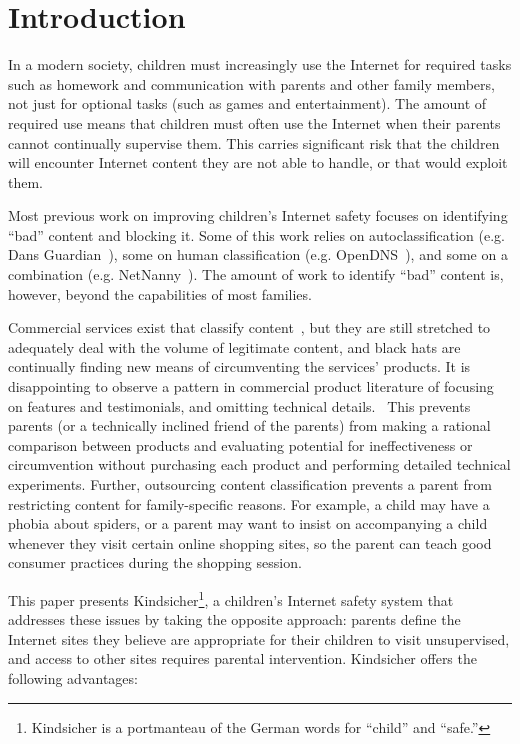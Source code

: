

\vspace{20mm}

\section{Introduction}
\nopagebreak
In a modern society, children must increasingly use the Internet for required
tasks such as homework and communication with parents and other family
members, not just for optional tasks (such as games and entertainment).
%
The amount of required use means that children must often use the Internet
when their parents cannot continually supervise them.
%
This carries significant risk that the children will encounter Internet
content they are not able to handle, or that would exploit them.

Most previous work on improving children's Internet safety focuses on
identifying ``bad'' content and blocking it. Some of this work relies
on autoclassification (e.g. Dans Guardian~\cite{dansguardian}), some on
human classification (e.g. OpenDNS~\cite{opendns}), and some on a
combination (e.g. NetNanny~\cite{netnanny}).
%
The amount of work to identify ``bad'' content is, however, beyond the
capabilities of most families.

Commercial services exist that classify content~\cite{opendns, netnanny,
mcafee,k9}, but they are still stretched to adequately deal with the volume of
legitimate content, and black hats are continually finding new means of
circumventing the services' products.
%
It is disappointing to observe a pattern in commercial product literature of
focusing on features and testimonials, and omitting technical
details.~\cite{opendns, kidlogger, mcafee, k9}
%
This prevents parents (or a technically inclined friend of the parents) from
making a rational comparison between products and evaluating potential for
ineffectiveness or circumvention without purchasing each product and
performing detailed technical experiments.
%
Further, outsourcing content classification prevents a parent from restricting
content for family-specific reasons.
%
For example, a child may have a phobia about spiders, or a parent may want to
insist on accompanying a child whenever they visit certain online shopping
sites, so the parent can teach good consumer practices during the shopping
session.

This paper presents Kindsicher\footnote{Kindsicher is a portmanteau of the
German words for ``child'' and ``safe.''}, a children's Internet safety system
that addresses these issues by taking the opposite approach:
%
parents define the Internet sites they believe are appropriate for their
children to visit unsupervised, and access to other sites requires parental
intervention.
%
Kindsicher offers the following advantages:


